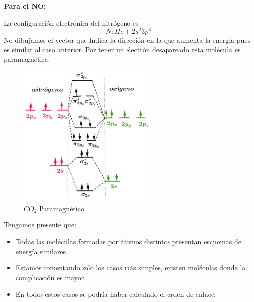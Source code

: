 \textbf{Para el NO:}

La configuración electrónica del nitrógeno es
\begin{equation}
	N: He+ 2s^{2}3p^{3}
\end{equation}
No dibujamos el vector que Indica la dirección en la que aumenta la energía pues es similar al caso anterior.
Por tener un electrón desapareado esta molécula es paramagnética.

\begin{figure}[H]
    \centering
    \includegraphics[width=0.6\textwidth]{./Figures/CO2Paramagnetico}
	\caption{$CO_{2}$ Paramagnético}
	\label{fig:CO2Paramagnetico}
\end{figure}

Tengamos presente que:

\begin{itemize}
	\item Todas las moléculas formadas por átomos distintos presentan esquemas de energía similares.
	\item Estamos comentando solo los casos más simples, existen moléculas donde la complicación es mayor.
	\item En todos estos casos se podría haber calculado el orden de enlace,
\end{itemize}

